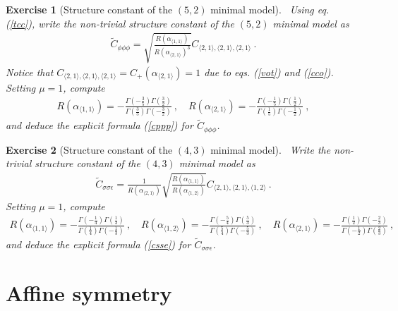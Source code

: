 \documentclass[12pt,a4paper,notitlepage]{report}
\numberwithin{equation}{section}
\theoremstyle{break}
\newtheorem{exo}{Exercise}[chapter]
\begin{document}
\begin{exo}[Structure constant of the $(5,2)$ minimal model]
 ~\label{exocppp}
Using eq. (\ref{tcc}), write the non-trivial structure constant of the $(5,2)$ minimal model as 
\begin{align}
 \tilde{C}_{\phi\phi\phi} = \sqrt{\frac{R(\alpha_{\langle 1,1 \rangle})}{R(\alpha_{\langle 2,1 \rangle})^3}} C_{\langle 2,1\rangle , \langle 2,1 \rangle,\langle 2,1 \rangle}\ .
\end{align}
Notice that $C_{\langle 2,1\rangle , \langle 2,1 \rangle,\langle 2,1 \rangle} = C_+(\alpha_{\langle 2,1 \rangle})=1$ due to eqs. (\ref{vot}) and (\ref{cco}). Setting $\mu=1$, compute
\begin{align}
 R(\alpha_{\langle 1,1 \rangle}) = -\frac{\Gamma(-\frac35)\Gamma(\frac32)}{\Gamma(\frac35)\Gamma(-\frac32)} \ , \quad R(\alpha_{\langle 2,1 \rangle}) = -\frac{\Gamma(-\frac15)\Gamma(\frac12)}{\Gamma(\frac15)\Gamma(-\frac12)}\ , 
\end{align}
and deduce the explicit formula (\ref{cppp}) for $\tilde{C}_{\phi\phi\phi}$.
\end{exo}

\begin{exo}[Structure constant of the $(4,3)$ minimal model]
 ~\label{exocsse}
Write the non-trivial structure constant of the $(4,3)$ minimal model as
\begin{align}
 \tilde{C}_{\sigma\sigma\epsilon} = \frac{1}{R(\alpha_{\langle 2,1 \rangle})}\sqrt{\frac{R(\alpha_{\langle 1,1 \rangle})}{R(\alpha_{\langle 1,2 \rangle})}} C_{\langle 2,1\rangle , \langle 2,1 \rangle,\langle 1,2 \rangle}\ .
\end{align}
Setting $\mu=1$, compute
\begin{align}
 R(\alpha_{\langle 1,1 \rangle}) = -\frac{\Gamma(-\frac14)\Gamma(\frac13)}{\Gamma(\frac14)\Gamma(-\frac13)} \ , \quad R(\alpha_{\langle 1,2 \rangle}) = -\frac{\Gamma(-\frac54)\Gamma(\frac53)}{\Gamma(\frac54)\Gamma(-\frac53)} \ , \quad R(\alpha_{\langle 2,1 \rangle}) = -\frac{\Gamma(\frac12)\Gamma(-\frac23)}{\Gamma(-\frac12)\Gamma(\frac23)}\ ,
\end{align}
and deduce the explicit formula (\ref{csse}) for $\tilde{C}_{\sigma\sigma\epsilon}$.
\end{exo}


\chapter{Affine symmetry \label{secaff}}
\end{document}
